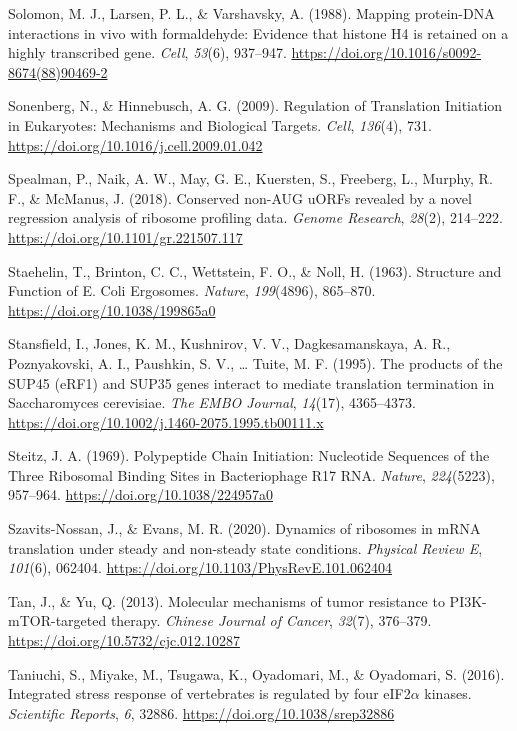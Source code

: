 \documentclass[12pt,openany]{book}
\begin{document}
\hypertarget{ref-Solomon1988}{}
Solomon, M. J., Larsen, P. L., \& Varshavsky, A. (1988). Mapping
protein-DNA interactions in vivo with formaldehyde: Evidence that
histone H4 is retained on a highly transcribed gene. \emph{Cell},
\emph{53}(6), 937--947.
\url{https://doi.org/10.1016/s0092-8674(88)90469-2}

\hypertarget{ref-Sonenberg2009}{}
Sonenberg, N., \& Hinnebusch, A. G. (2009). Regulation of Translation
Initiation in Eukaryotes: Mechanisms and Biological Targets.
\emph{Cell}, \emph{136}(4), 731.
\url{https://doi.org/10.1016/j.cell.2009.01.042}

\hypertarget{ref-Spealman2018}{}
Spealman, P., Naik, A. W., May, G. E., Kuersten, S., Freeberg, L.,
Murphy, R. F., \& McManus, J. (2018). Conserved non-AUG uORFs revealed
by a novel regression analysis of ribosome profiling data. \emph{Genome
Research}, \emph{28}(2), 214--222.
\url{https://doi.org/10.1101/gr.221507.117}

\hypertarget{ref-Staehelin1963}{}
Staehelin, T., Brinton, C. C., Wettstein, F. O., \& Noll, H. (1963).
Structure and Function of E. Coli Ergosomes. \emph{Nature},
\emph{199}(4896), 865--870. \url{https://doi.org/10.1038/199865a0}

\hypertarget{ref-Stansfield1995}{}
Stansfield, I., Jones, K. M., Kushnirov, V. V., Dagkesamanskaya, A. R.,
Poznyakovski, A. I., Paushkin, S. V., \ldots{} Tuite, M. F. (1995). The
products of the SUP45 (eRF1) and SUP35 genes interact to mediate
translation termination in Saccharomyces cerevisiae. \emph{The EMBO
Journal}, \emph{14}(17), 4365--4373.
\url{https://doi.org/10.1002/j.1460-2075.1995.tb00111.x}

\hypertarget{ref-Steitz1969}{}
Steitz, J. A. (1969). Polypeptide Chain Initiation: Nucleotide Sequences
of the Three Ribosomal Binding Sites in Bacteriophage R17 RNA.
\emph{Nature}, \emph{224}(5223), 957--964.
\url{https://doi.org/10.1038/224957a0}

\hypertarget{ref-Szavits-Nossan2020a}{}
Szavits-Nossan, J., \& Evans, M. R. (2020). Dynamics of ribosomes in
mRNA translation under steady and non-steady state conditions.
\emph{Physical Review E}, \emph{101}(6), 062404.
\url{https://doi.org/10.1103/PhysRevE.101.062404}

\hypertarget{ref-Tan2013}{}
Tan, J., \& Yu, Q. (2013). Molecular mechanisms of tumor resistance to
PI3K-mTOR-targeted therapy. \emph{Chinese Journal of Cancer},
\emph{32}(7), 376--379. \url{https://doi.org/10.5732/cjc.012.10287}

\hypertarget{ref-Taniuchi2016}{}
Taniuchi, S., Miyake, M., Tsugawa, K., Oyadomari, M., \& Oyadomari, S.
(2016). Integrated stress response of vertebrates is regulated by four
eIF2\(\alpha\) kinases. \emph{Scientific Reports}, \emph{6}, 32886.
\url{https://doi.org/10.1038/srep32886}
\end{document}
